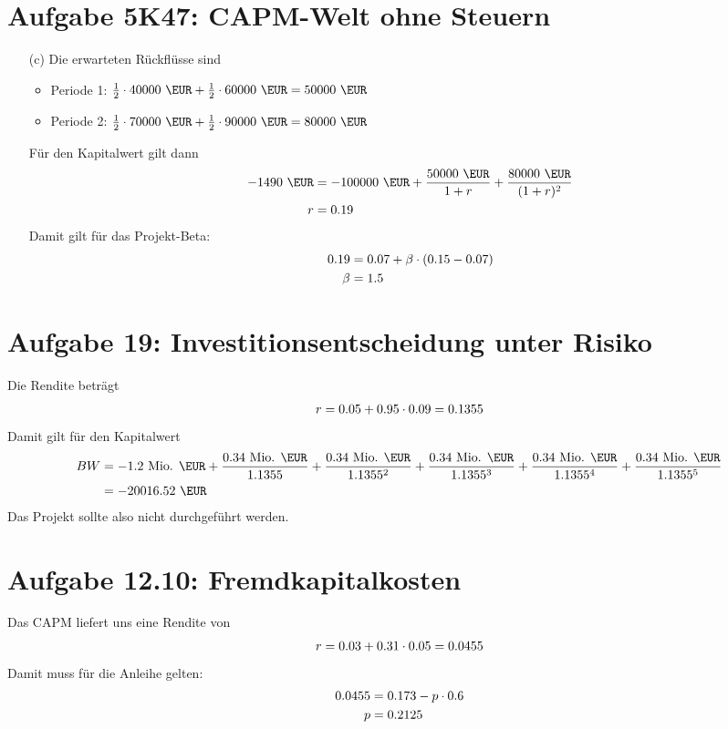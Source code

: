 \documentclass{article}
\begin{document}
	\section*{Aufgabe 5K47: CAPM-Welt ohne Steuern}
	\begin{itemize}
		\item[(c)] Die erwarteten Rückflüsse sind
		\begin{itemize}
			\item Periode 1: $\frac{1}{2}\cdot 40000\text{ \EUR} + \frac{1}{2}\cdot 60000\text{ \EUR} = 50000\text{ \EUR}$
			\item Periode 2: $\frac{1}{2}\cdot 70000\text{ \EUR} + \frac{1}{2}\cdot 90000\text{ \EUR} = 80000\text{ \EUR}$
		\end{itemize}
		Für den Kapitalwert gilt dann
		\begin{align}
			-1490\text{ \EUR} &= -100000\text{ \EUR} + \frac{50000\text{ \EUR}}{1+r} + \frac{80000\text{ \EUR}}{(1+r)^2} \notag \\
			r &= 0.19 \notag
		\end{align}
		Damit gilt für das Projekt-Beta:
		\begin{align}
			0.19 &= 0.07 + \beta\cdot (0.15-0.07) \notag \\
			\beta &= 1.5 \notag
		\end{align}
	\end{itemize}

	\section*{Aufgabe 19: Investitionsentscheidung unter Risiko}
	Die Rendite beträgt
	\begin{align}
		r = 0.05 + 0.95\cdot 0.09 = 0.1355 \notag
	\end{align}
	Damit gilt für den Kapitalwert
	\begin{align}
		BW &= -1.2\text{ Mio. \EUR} + \frac{0.34\text{ Mio. \EUR}}{1.1355} + \frac{0.34\text{ Mio. \EUR}}{1.1355^2} + \frac{0.34\text{ Mio. \EUR}}{1.1355^3} + \frac{0.34\text{ Mio. \EUR}}{1.1355^4} + \frac{0.34\text{ Mio. \EUR}}{1.1355^5} \notag \\
		&= -20016.52\text{ \EUR} \notag
	\end{align}
	Das Projekt sollte also nicht durchgeführt werden.

	\section*{Aufgabe 12.10: Fremdkapitalkosten}
	Das CAPM liefert uns eine Rendite von
	\begin{align}
		r = 0.03 + 0.31\cdot 0.05 = 0.0455 \notag
	\end{align}
	Damit muss für die Anleihe gelten:
	\begin{align}
		0.0455 &= 0.173 - p\cdot 0.6 \notag \\
		p &= 0.2125 \notag
	\end{align}
\end{document}
